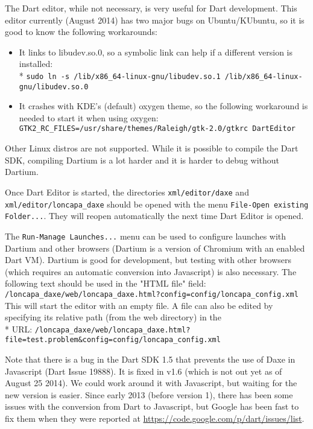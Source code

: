 The Dart editor, while not necessary, is very useful for Dart development. This editor currently (August 2014) has two major bugs on Ubuntu/KUbuntu, so it is good to know the following workarounds:
\begin{itemize}
\item It links to libudev.so.0, so a symbolic link can help if a different version is installed: \\*
  \texttt{sudo ln -s /lib/x86\_64-linux-gnu/libudev.so.1 /lib/x86\_64-linux-gnu/libudev.so.0}
\item It crashes with KDE's (default) oxygen theme, so the following workaround is needed to start it when using oxygen:
  \texttt{GTK2\_RC\_FILES=/usr/share/themes/Raleigh/gtk-2.0/gtkrc DartEditor}
\end{itemize}

Other Linux distros are not supported. While it is possible to compile the Dart SDK, compiling Dartium is a lot harder and it is harder to debug without Dartium.

Once Dart Editor is started, the directories \texttt{xml/editor/daxe} and \texttt{xml/editor/loncapa\_daxe} should be opened with the menu \texttt{File-Open existing Folder...}. They will reopen automatically the next time Dart Editor is opened.

The \texttt{Run-Manage Launches...} menu can be used to configure launches with Dartium and other browsers (Dartium is a version of Chromium with an enabled Dart VM). Dartium is good for development, but testing with other browsers (which requires an automatic conversion into Javascript) is also necessary.
The following text should be used in the "HTML file" field:
\texttt{/loncapa\_daxe/web/loncapa\_daxe.html?config=config/loncapa\_config.xml}
This will start the editor with an empty file. A file can also be edited by specifying its relative path (from the web directory) in the \\*
URL: \texttt{/loncapa\_daxe/web/loncapa\_daxe.html?file=test.problem\&config=config/loncapa\_config.xml}

Note that there is a bug in the Dart SDK 1.5 that prevents the use of Daxe in Javascript (Dart Issue 19888). It is fixed in v1.6 (which is not out yet as of August 25 2014). We could work around it with Javascript, but waiting for the new version is easier. Since early 2013 (before version 1), there has been some issues with the conversion from Dart to Javascript, but Google has been fast to fix them when they were reported at \url{https://code.google.com/p/dart/issues/list}.

